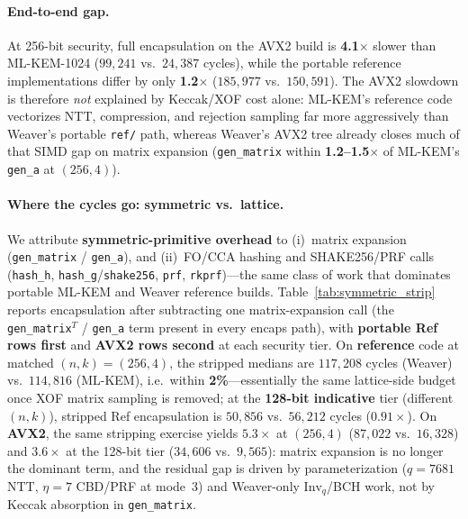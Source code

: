 \paragraph{End-to-end gap.}
At 256-bit security, full encapsulation on the AVX2 build is
\textbf{4.1$\times$} slower than ML-KEM-1024
($99{,}241$ vs.\ $24{,}387$ cycles), while the portable reference implementations
differ by only \textbf{1.2$\times$}
($185{,}977$ vs.\ $150{,}591$).
The AVX2 slowdown is therefore \emph{not} explained by Keccak/XOF cost alone:
ML-KEM's reference code vectorizes NTT, compression, and rejection sampling far
more aggressively than Weaver's portable \texttt{ref/} path, whereas Weaver's
AVX2 tree already closes much of that SIMD gap on matrix expansion
(\texttt{gen\_matrix} within \textbf{1.2--1.5$\times$} of ML-KEM's \texttt{gen\_a}
at $(256,4)$).

\paragraph{Where the cycles go: symmetric vs.\ lattice.}
We attribute \textbf{symmetric-primitive overhead} to (i)~matrix expansion
(\texttt{gen\_matrix} / \texttt{gen\_a}), and (ii)~FO/CCA hashing and
SHAKE256/PRF calls (\texttt{hash\_h}, \texttt{hash\_g}/\texttt{shake256},
\texttt{prf}, \texttt{rkprf})---the same class of work that dominates portable
ML-KEM and Weaver reference builds.
Table~\ref{tab:symmetric_strip} reports encapsulation after subtracting one
matrix-expansion call (the \texttt{gen\_matrix}$^T$ / \texttt{gen\_a} term
present in every encaps path), with \textbf{portable Ref rows first} and
\textbf{AVX2 rows second} at each security tier.
On \textbf{reference} code at matched $(n,k){=}(256,4)$, the stripped medians
are $117{,}208$ cycles (Weaver) vs.\ $114{,}816$ (ML-KEM), i.e.\ within
\textbf{2\%}---essentially the same lattice-side budget once XOF matrix sampling
is removed; at the \textbf{128-bit indicative} tier (different $(n,k)$), stripped
Ref encapsulation is $50{,}856$ vs.\ $56{,}212$ cycles ($0.91\times$).
On \textbf{AVX2}, the same stripping exercise yields $5.3\times$ at
$(256,4)$ ($87{,}022$ vs.\ $16{,}328$) and $3.6\times$ at the 128-bit tier
($34{,}606$ vs.\ $9{,}565$): matrix expansion is no longer the dominant term,
and the residual gap is driven by parameterization ($q{=}7681$ NTT, $\eta{=}7$
CBD/PRF at mode~3) and Weaver-only $\mathrm{Inv}_q$/BCH work, not by Keccak
absorption in \texttt{gen\_matrix}.

